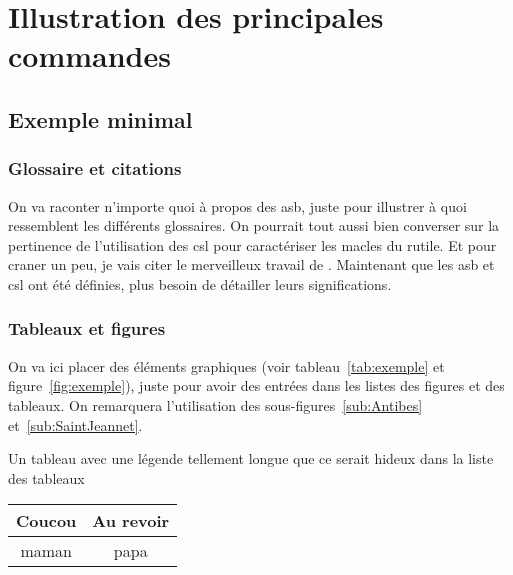 \chapter{Illustration des principales commandes}
	\minitoc
	\newpage





\section{Exemple minimal}
	\subsection{Glossaire et citations}
		On va raconter n'importe quoi à propos des \gls{asb}, juste pour illustrer à quoi ressemblent les différents glossaires. On pourrait tout aussi bien converser sur la pertinence de l'utilisation des \gls{csl} pour caractériser les \glspl{macle} du \gls{rutile}. Et pour craner un peu, je vais citer le merveilleux travail de \citet{depriester2014thermomechanical}. Maintenant que les \gls{asb} et \gls{csl} ont été définies, plus besoin de détailler leurs significations.
		
	\subsection{Tableaux et figures}
	On va ici placer des éléments graphiques (voir tableau~\ref{tab:exemple} et figure~\ref{fig:exemple}), juste pour avoir des entrées dans les listes des figures et des tableaux. On remarquera l'utilisation des sous-figures~\ref{sub:Antibes} et~\ref{sub:SaintJeannet}.
	
	\begin{tableth}
		\caption[Légende courte pour l'exemple de tableau]{Un tableau avec une légende tellement longue que ce serait hideux dans la liste des tableaux}
			\label{tab:exemple}
		\begin{tabular}{c|c}
			Coucou	& Au revoir\\
			\hline
			maman	& papa
		\end{tabular}
	\end{tableth}

